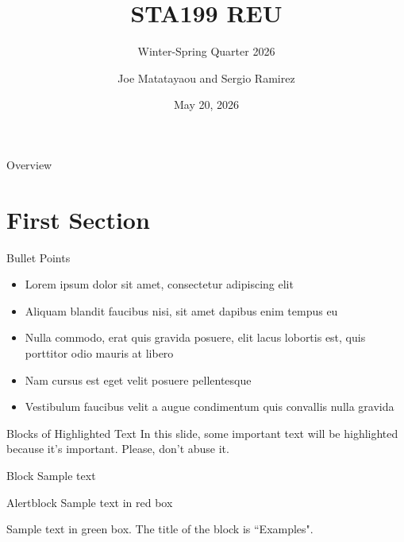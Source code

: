 \documentclass[aspectratio=169,xcolor=dvipsnames]{beamer}
\title{STA199 REU}
\subtitle{Winter-Spring Quarter 2026}
\author{Joe Matatayaou and Sergio Ramirez}
\institute
{
    UC Davis Department of Statistics %
}
\date{May 20, 2026} %
\begin{document}
\begin{frame}
    \titlepage
\end{frame}

\begin{frame}{Overview}
    \tableofcontents
\end{frame}



\section{First Section}

\begin{frame}{Bullet Points}
    \begin{itemize}
        \item Lorem ipsum dolor sit amet, consectetur adipiscing elit
        \item Aliquam blandit faucibus nisi, sit amet dapibus enim tempus eu
        \item Nulla commodo, erat quis gravida posuere, elit lacus lobortis est, quis porttitor odio mauris at libero
        \item Nam cursus est eget velit posuere pellentesque
        \item Vestibulum faucibus velit a augue condimentum quis convallis nulla gravida
    \end{itemize}
\end{frame}


\begin{frame}{Blocks of Highlighted Text}
    In this slide, some important text will be \alert{highlighted} because it's important. Please, don't abuse it.

    \begin{block}{Block}
        Sample text
    \end{block}

    \begin{alertblock}{Alertblock}
        Sample text in red box
    \end{alertblock}

    \begin{examples}
        Sample text in green box. The title of the block is ``Examples".
    \end{examples}
\end{frame}
\end{document}

